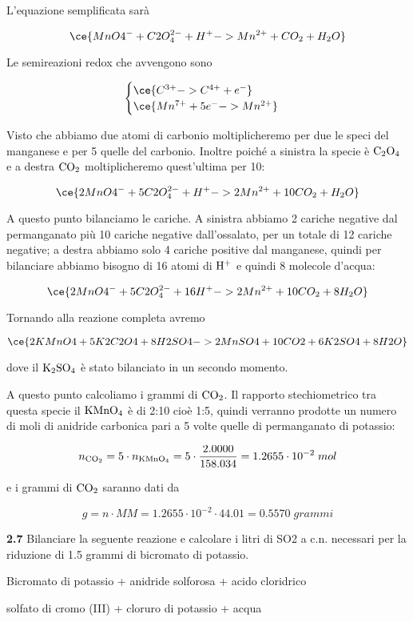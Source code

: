 L'equazione semplificata sarà

$$\ce{MnO4^- + C2O_4^{2-} + H^+ -> Mn^{2+} + CO_2 + H_2O}$$

Le semireazioni redox che avvengono sono

$$\begin{cases}
    \ce{C^{3+} -> C^{4+} + e^-}\\
    \ce{Mn^{7+} + 5e^- -> Mn^{2+}}
\end{cases}$$

Visto che abbiamo due atomi di carbonio moltiplicheremo per due le speci del manganese e per 5 quelle del carbonio. Inoltre poiché a sinistra la specie è $\rm C_2O_4$ e a destra $\rm CO_2$ moltiplicheremo quest'ultima per 10:

$$\ce{2MnO4^- + 5C2O_4^{2-} + H^+ -> 2Mn^{2+} + 10CO_2 + H_2O}$$

A questo punto bilanciamo le cariche. A sinistra abbiamo 2 cariche negative dal permanganato più 10 cariche negative dall'ossalato, per un totale di 12 cariche negative; a destra abbiamo solo 4 cariche positive dal manganese, quindi per bilanciare abbiamo bisogno di 16 atomi di $\rm H^+$ e quindi 8 molecole d'acqua:

$$\ce{2MnO4^- + 5C2O_4^{2-} + 16H^+ -> 2Mn^{2+} + 10CO_2 + 8H_2O}$$

Tornando alla reazione completa avremo

$$\ce{2KMnO4 + 5K2C2O4 + 8H2SO4 -> 2MnSO4 + 10CO2 + 6K2SO4 + 8H2O}$$

dove il $\rm K_2SO_4$ è stato bilanciato in un secondo momento.

A questo punto calcoliamo i grammi di $\rm CO_2$. Il rapporto stechiometrico tra questa specie il $\rm KMnO_4$ è di 2:10 cioè 1:5, quindi verranno prodotte un numero di moli di anidride carbonica pari a 5 volte quelle di permanganato di potassio:

$$n_{\rm CO_2}=5 \cdot n_{\rm KMnO_4}
=5 \cdot \frac{2.0000}{158.034}
=1.2655 \cdot 10^{-2}\;mol$$

e i grammi di $\rm CO_2$ saranno dati da

$$g=n \cdot MM=1.2655 \cdot 10^{-2} \cdot 44.01
=0.5570\;grammi$$

\vspace{0.2cm}\textbf{2.7} Bilanciare la seguente reazione e calcolare i litri di SO2 a c.n. necessari per la riduzione di 1.5
grammi di bicromato di potassio.

\begin{center}
    Bicromato di potassio + anidride solforosa + acido cloridrico \ce{->}

    \ce{->} solfato di cromo (III) + cloruro di potassio + acqua
\end{center}

